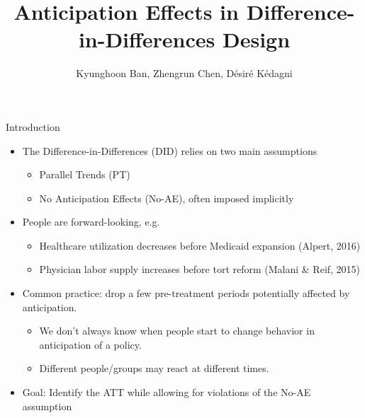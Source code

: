 \documentclass[aspectratio=1610, 9pt]{beamer}
\title[Chen 2025]{Anticipation Effects in Difference-in-Differences Design}
\author{Kyunghoon Ban, Zhengrun Chen, D\'esir\'e K\'edagni}
\begin{document}
\maketitle

\begin{frame}{Introduction}
\begin{itemize}
    \item The Difference-in-Differences (DID) relies on two main assumptions
         \begin{itemize}
     \item[-] Parallel Trends (PT)
     \item[-] No Anticipation Effects (No-AE), often imposed implicitly
     \end{itemize}
     
    \item People are forward-looking, e.g. 
     \begin{itemize}
     \item[-] Healthcare utilization decreases before Medicaid expansion (Alpert, 2016)
     \item[-] Physician labor supply increases before tort reform (Malani \& Reif, 2015)
     \end{itemize}
     \item Common practice: drop a few pre-treatment periods potentially affected by anticipation. 
     \begin{itemize}
         \item We don’t always know when people start to change behavior in anticipation of a policy.
         \item Different people/groups may react at different times.
     \end{itemize}
    \item Goal: Identify the ATT while allowing for violations of the No-AE assumption
\end{itemize}
\end{frame}
\end{document}
